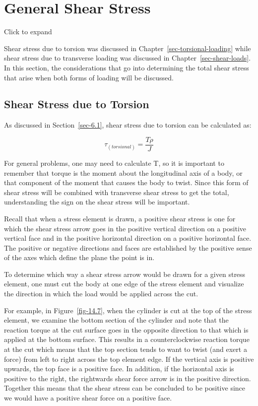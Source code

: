 \documentclass[
  letterpaper,
  DIV=11,
  numbers=noendperiod]{scrreprt}
\theoremstyle{definition}
\theoremstyle{remark}
\begin{document}
\section{General Shear Stress}\label{sec-14.2}

Click to expand

Shear stress due to torsion was discussed in
Chapter~\ref{sec-torsional-loading} while shear stress due to transverse
loading was discussed in Chapter~\ref{sec-shear-loads}. In this section,
the considerations that go into determining the total shear stress that
arise when both forms of loading will be discussed.

\subsection{Shear Stress due to Torsion}\label{sec-14.2.1}

As discussed in Section~\ref{sec-6.1}, shear stress due to torsion can
be calculated as:

\[
\tau_{(torsional)}=\frac{T \rho}{J}
\]

For general problems, one may need to calculate T, so it is important to
remember that torque is the moment about the longitudinal axis of a
body, or that component of the moment that causes the body to twist.
Since this form of shear stress will be combined with transverse shear
stress to get the total, understanding the sign on the shear stress will
be important.

Recall that when a stress element is drawn, a positive shear stress is
one for which the shear stress arrow goes in the positive vertical
direction on a positive vertical face and in the positive horizontal
direction on a positive horizontal face. The positive or negative
directions and faces are established by the positive sense of the axes
which define the plane the point is in.

To determine which way a shear stress arrow would be drawn for a given
stress element, one must cut the body at one edge of the stress element
and visualize the direction in which the load would be applied across
the cut.

For example, in Figure~\ref{fig-14.7}, when the cylinder is cut at the
top of the stress element, we examine the bottom section of the cylinder
and note that the reaction torque at the cut surface goes in the
opposite direction to that which is applied at the bottom surface. This
results in a counterclockwise reaction torque at the cut which means
that the top section tends to want to twist (and exert a force) from
left to right across the top element edge. If the vertical axis is
positive upwards, the top face is a positive face. In addition, if the
horizontal axis is positive to the right, the rightwards shear force
arrow is in the positive direction. Together this means that the shear
stress can be concluded to be positive since we would have a positive
shear force on a positive face.
\end{document}
